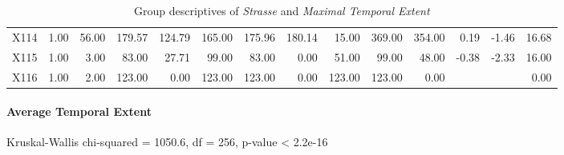 \begin{table}[ht!]
\begin{tabular}{rrrrrrrrrrrrrr}
    X114 & 1.00 & 56.00 & 179.57 & 124.79 & 165.00 & 175.96 & 180.14 & 15.00 & 369.00 & 354.00 & 0.19 & -1.46 & 16.68 \\ 
    X115 & 1.00 & 3.00 & 83.00 & 27.71 & 99.00 & 83.00 & 0.00 & 51.00 & 99.00 & 48.00 & -0.38 & -2.33 & 16.00 \\ 
    X116 & 1.00 & 2.00 & 123.00 & 0.00 & 123.00 & 123.00 & 0.00 & 123.00 & 123.00 & 0.00 &  &  & 0.00 \\ 
     \hline
  \end{tabular}
	\caption{Group descriptives of \textit{Strasse} and \textit{Maximal Temporal Extent}}
	\label{tbl:descriptives_baysis_matched_Strasse_TMax}
\end{table}


\paragraph{Average Temporal Extent}
Kruskal-Wallis chi-squared = 1050.6, df = 256, p-value < 2.2e-16

